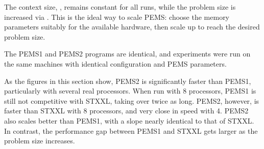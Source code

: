 \documentclass[12pt]{carletoncsthesis}
\begin{document}
The context size, , remains constant for all runs, while the problem
size is increased via .  This is the ideal way to scale PEMS: choose
the memory parameters suitably for the available hardware, then scale 
up to reach the desired problem size.

The PEMS1 and PEMS2 programs are identical, and experiments were run on the
same machines with identical configuration and PEMS parameters.

As the figures in this section show, PEMS2 is significantly faster than
PEMS1, particularly with several real processors.  When run with 8 processors,
PEMS1 is still not competitive with STXXL, taking over twice as long.  PEMS2,
however, is faster than STXXL with 8 processors, and very close in speed
with 4.  PEMS2 also scales better than PEMS1, with a slope nearly identical
to that of STXXL.  In contrast, the performance gap between PEMS1 and STXXL
gets larger as the problem size increases.
\end{document}
